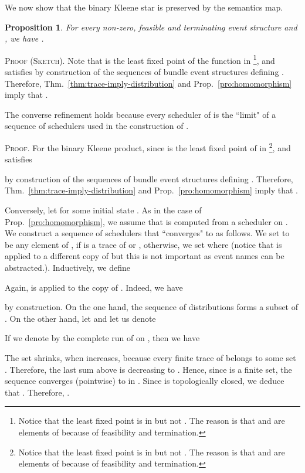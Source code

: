 \documentclass[review]{elsart}
\newtheorem{proposition}[definition]{Proposition}
\newenvironment{proof}{\par
\noindent
\textsc{Proof. }
\noindent}{\hfill}
\newenvironment{proofsummary}{\par
\noindent
\textsc{Proof (Sketch). }
\noindent}{\hfill}
\newcommand{\Prop}[1]{Prop.~\ref{#1}}
\newcommand{\Thm}[1]{Thm.~\ref{#1}}
\begin{document}
We now show that the binary Kleene star is preserved by the semantics map.

\begin{proposition}\label{pro:*-homomorphism}
For every non-zero, feasible and terminating event structure  and , we have .
\end{proposition}
\begin{proofsummary}
  Note that  is the least fixed point of the function  in \footnote{Notice that the least fixed point is in  but not . The reason is that  and  are elements of  because of feasibility and termination.}, and  satisfies  by construction of the sequences of bundle event structures defining . Therefore, \Thm{thm:trace-imply-distribution} and \Prop{pro:homomorphism} imply that .

The converse refinement  holds because every scheduler of  is the ``limit" of a sequence of schedulers used in the construction of .
\end{proofsummary}

\begin{proof}
For the binary Kleene product, since  is the least fixed point of  in \footnote{Notice that the least fixed point is in  but not . The reason is that  and  are elements of  because of feasibility and termination.}, and  satisfies 

by construction of the sequences of bundle event structures defining . Therefore, \Thm{thm:trace-imply-distribution} and \Prop{pro:homomorphism} imply that . 

Conversely, let  for some initial state . As in the case of \Prop{pro:homomorphism}, we assume that  is computed from a scheduler  on . We construct a sequence of schedulers  that ``converges" to  as follows. We set  to be any element of ,  if  is a trace of  or , otherwise, we set  where  (notice that  is applied to a different copy of  but this is not important as event names can be abstracted.). Inductively, we define 
  

Again,  is applied to the  copy of . Indeed, we have 
 
by construction. On the one hand, the sequence of distributions  forms a subset of . On the other hand, let  and let us denote 
	
If we denote by  the complete run of  on , then we have

The set  shrinks, when  increases, because every finite trace of  belongs to some set . Therefore, the last sum above is decreasing to . Hence, since  is a finite set, the sequence  converges (pointwise) to  in . Since  is topologically closed, we deduce that . Therefore, .
\end{proof}
\end{document}
